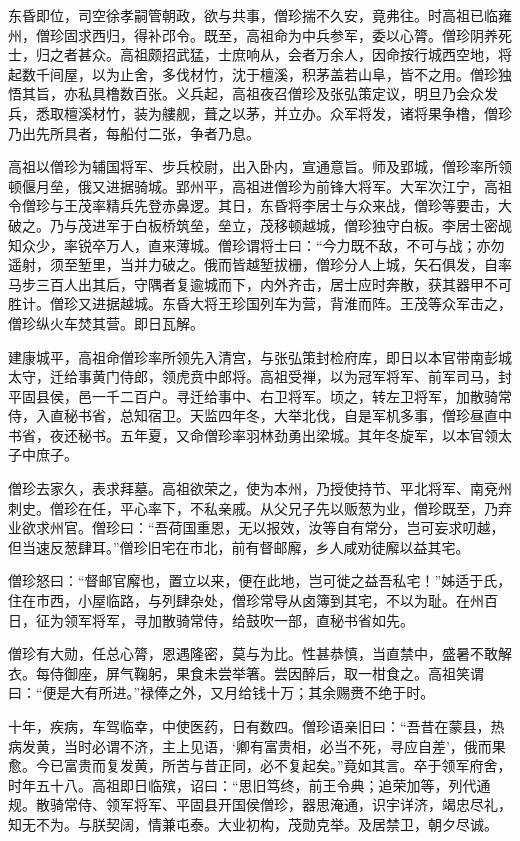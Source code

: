 \documentclass[12pt,UTF8]{ctexbook}
\begin{document}
东昏即位，司空徐孝嗣管朝政，欲与共事，僧珍揣不久安，竟弗往。时高祖已临雍州，僧珍固求西归，得补邔令。既至，高祖命为中兵参军，委以心膂。僧珍阴养死士，归之者甚众。高祖颇招武猛，士庶响从，会者万余人，因命按行城西空地，将起数千间屋，以为止舍，多伐材竹，沈于檀溪，积茅盖若山阜，皆不之用。僧珍独悟其旨，亦私具橹数百张。义兵起，高祖夜召僧珍及张弘策定议，明旦乃会众发兵，悉取檀溪材竹，装为艛舰，葺之以茅，并立办。众军将发，诸将果争橹，僧珍乃出先所具者，每船付二张，争者乃息。

高祖以僧珍为辅国将军、步兵校尉，出入卧内，宣通意旨。师及郢城，僧珍率所领顿偃月垒，俄又进据骑城。郢州平，高祖进僧珍为前锋大将军。大军次江宁，高祖令僧珍与王茂率精兵先登赤鼻逻。其日，东昏将李居士与众来战，僧珍等要击，大破之。乃与茂进军于白板桥筑垒，垒立，茂移顿越城，僧珍独守白板。李居士密觇知众少，率锐卒万人，直来薄城。僧珍谓将士曰：“今力既不敌，不可与战；亦勿遥射，须至堑里，当并力破之。俄而皆越堑拔栅，僧珍分人上城，矢石俱发，自率马步三百人出其后，守隅者复逾城而下，内外齐击，居士应时奔散，获其器甲不可胜计。僧珍又进据越城。东昏大将王珍国列车为营，背淮而阵。王茂等众军击之，僧珍纵火车焚其营。即日瓦解。

建康城平，高祖命僧珍率所领先入清宫，与张弘策封检府库，即日以本官带南彭城太守，迁给事黄门侍郎，领虎贲中郎将。高祖受禅，以为冠军将军、前军司马，封平固县侯，邑一千二百户。寻迁给事中、右卫将军。顷之，转左卫将军，加散骑常侍，入直秘书省，总知宿卫。天监四年冬，大举北伐，自是军机多事，僧珍昼直中书省，夜还秘书。五年夏，又命僧珍率羽林劲勇出梁城。其年冬旋军，以本官领太子中庶子。

僧珍去家久，表求拜墓。高祖欲荣之，使为本州，乃授使持节、平北将军、南兗州刺史。僧珍在任，平心率下，不私亲戚。从父兄子先以贩葱为业，僧珍既至，乃弃业欲求州官。僧珍曰：“吾荷国重恩，无以报效，汝等自有常分，岂可妄求叨越，但当速反葱肆耳。”僧珍旧宅在市北，前有督邮廨，乡人咸劝徒廨以益其宅。

僧珍怒曰：“督邮官廨也，置立以来，便在此地，岂可徙之益吾私宅！”姊适于氏，住在市西，小屋临路，与列肆杂处，僧珍常导从卤簿到其宅，不以为耻。在州百日，征为领军将军，寻加散骑常侍，给鼓吹一部，直秘书省如先。

僧珍有大勋，任总心膂，恩遇隆密，莫与为比。性甚恭慎，当直禁中，盛暑不敢解衣。每侍御座，屏气鞠躬，果食未尝举箸。尝因醉后，取一柑食之。高祖笑谓曰：“便是大有所进。”禄俸之外，又月给钱十万；其余赐赉不绝于时。

十年，疾病，车驾临幸，中使医药，日有数四。僧珍语亲旧曰：“吾昔在蒙县，热病发黄，当时必谓不济，主上见语，‘卿有富贵相，必当不死，寻应自差’，俄而果愈。今已富贵而复发黄，所苦与昔正同，必不复起矣。”竟如其言。卒于领军府舍，时年五十八。高祖即日临殡，诏曰：“思旧笃终，前王令典；追荣加等，列代通规。散骑常侍、领军将军、平固县开国侯僧珍，器思淹通，识宇详济，竭忠尽礼，知无不为。与朕契阔，情兼屯泰。大业初构，茂勋克举。及居禁卫，朝夕尽诚。
\end{document}
